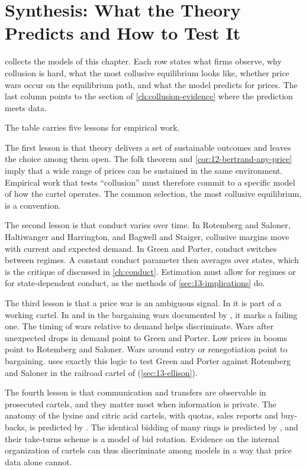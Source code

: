 \section{Synthesis: What the Theory Predicts and How to Test It}\label{sec:12-synthesis}

 collects the models of this chapter. Each row states what firms observe, why collusion is hard,
what the most collusive equilibrium looks like, whether price wars occur on the equilibrium path, and what the model
predicts for prices. The last column points to the section of \cref{ch:collusion-evidence} where the prediction meets
data.

The table carries five lessons for empirical work.

The first lesson is that theory delivers a set of sustainable outcomes and leaves the choice among them open. The
folk theorem and
\cref{cor:12-bertrand-any-price} imply that a wide range of prices can be sustained in the same environment. Empirical
work that tests ``collusion'' must therefore commit to a specific model of how the cartel operates. The common
selection, the most collusive equilibrium, is a convention.

The second lesson is that conduct varies over time. In Rotemberg and Saloner, Haltiwanger and Harrington, and Bagwell
and Staiger, collusive margins move with current and expected demand. In Green and Porter, conduct switches between
regimes. A constant conduct parameter then averages over states, which is the critique of \citet{Corts1999} discussed
in \cref{ch:conduct}. Estimation must allow for regimes or for state-dependent conduct, as the methods of
\cref{sec:13-implications} do.

The third lesson is that a price war is an ambiguous signal. In \citet{GreenPorter1984} it is part of a working
cartel. In \citet{Stigler1964} and in the bargaining wars documented by \citet{LevensteinSuslow2006}, it marks a
failing one. The timing of wars relative to demand helps discriminate. Wars after unexpected drops in demand point to
Green and Porter. Low prices in booms point to Rotemberg and Saloner. Wars around entry or renegotiation point to
bargaining.  uses exactly this logic to test Green and Porter against Rotemberg and Saloner in the
railroad cartel of \citet{Porter1983} (\cref{sec:13-ellison}).

The fourth lesson is that communication and transfers are observable in prosecuted cartels, and they matter most when
information is private. The anatomy of the lysine and citric acid cartels, with quotas, sales reports and buy-backs, is
predicted by \citet{HarringtonSkrzypacz2011}. The identical bidding of many rings is predicted by
\citet{AtheyBagwellSanchirico2004}, and their take-turns scheme is a model of bid rotation. Evidence on the internal organization of cartels can thus discriminate among
models in a way that price data alone cannot.

